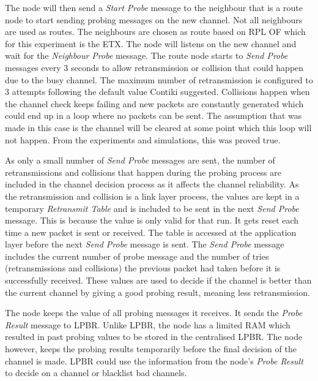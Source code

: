 The node will then send a \textit{Start Probe} message to the neighbour that is a route node to start sending probing messages on the new channel. Not all neighbours are used as routes. The neighbours are chosen as route based on RPL OF which for this experiment is the ETX. The node will listens on the new channel and wait for the \textit{Neighbour Probe} message. The route node starts to \textit{Send Probe} messages every 3 seconds to allow retransmission or collision that could happen due to the busy channel. The maximum number of retransmission is configured to 3 attempts following the default value Contiki suggested. Collisions happen when the channel check keeps failing and new packets are constantly generated which could end up in a loop where no packets can be sent. The assumption that was made in this case is the channel will be cleared at some point which this loop will not happen. From the experiments and simulations, this was proved true.

As only a small number of \textit{Send Probe} messages are sent, the number of retransmissions and collisions that happen during the probing process are included in the channel decision process as it affects the channel reliability.
As the retransmission and collision is a link layer process, the values are kept in a temporary \textit{Retransmit Table} and is included to be sent in the next \textit{Send Probe} message. This is because the value is only valid for that run. It gets reset each time a new packet is sent or received. The table is accessed at the application layer before the next \textit{Send Probe} message is sent. The \textit{Send Probe} message includes the current number of probe message and the number of tries (retransmissions and collisions) the previous packet had taken before it is successfully received. These values are used to decide if the channel is better than the current channel by giving a good probing result, meaning less retransmission.

The node keeps the value of all probing messages it receives. It sends the \textit{Probe Result} message to LPBR. 
Unlike LPBR, the node has a limited RAM which resulted in past probing values to be stored in the centralised LPBR. The node however, keeps the probing results temporarily before the final decision of the channel is made. 
LPBR could use the information from the node's \textit{Probe Result} to decide on a channel or blacklist bad channels. 

